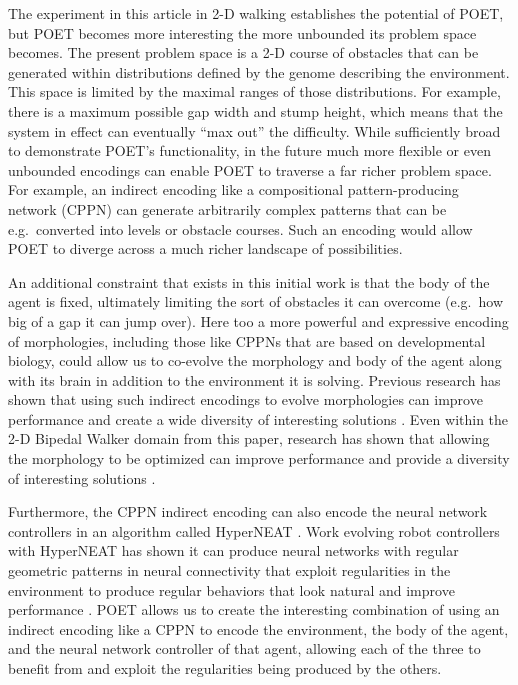 \documentclass{article}
\begin{document}
The experiment in this article in 2-D walking establishes the potential of POET, but POET becomes more interesting the more unbounded its problem space becomes.  The present problem space is a 2-D course of obstacles that can be generated within distributions defined by the genome describing the environment.  This space is limited by the maximal
ranges of those distributions.  For example, there is a maximum possible gap width and stump height, which means that the system in effect can eventually ``max out'' the difficulty.  While sufficiently broad to demonstrate POET's functionality, in the future much more flexible or even unbounded encodings can enable POET to traverse a far richer problem space.  For example, an indirect encoding like a compositional pattern-producing network (CPPN) \cite{stanley:gpem07} can generate arbitrarily complex patterns that can be e.g.\ converted into levels or obstacle courses.  Such an encoding would allow POET to diverge across a much richer landscape of possibilities.

An additional constraint that exists in this initial work is that the body of the agent is fixed, ultimately limiting the sort of obstacles it can overcome (e.g.\ how big of a gap it can jump over). Here too a more powerful and expressive encoding of morphologies, including those like CPPNs that are based on developmental biology, could allow us to co-evolve the morphology and body of the agent along with its brain in addition to the environment it is solving. Previous research has shown that using such indirect encodings to evolve morphologies can improve performance and create a wide diversity of interesting solutions \cite{cheney:gecco13}. Even within the 2-D Bipedal Walker domain from this paper, research has shown that allowing the morphology to be optimized can improve performance and provide a diversity of interesting solutions \cite{davidha:arxiv18}.

Furthermore, the  CPPN indirect encoding can also encode the neural network controllers in an algorithm called HyperNEAT \cite{stanley:alife09}.  Work evolving robot controllers with HyperNEAT has shown it can produce neural networks with regular geometric patterns in neural connectivity that exploit regularities in the environment to produce regular behaviors that look natural and improve performance \cite{clune:ieeetec11, clune:cec09, clune:cec09, yosinski:ecal11}. POET allows us to create the interesting combination of using an indirect encoding like a CPPN to encode the environment, the body of the agent, and the neural network controller of that agent, allowing each of the three to benefit from and exploit the regularities being produced by the others.
\end{document}
